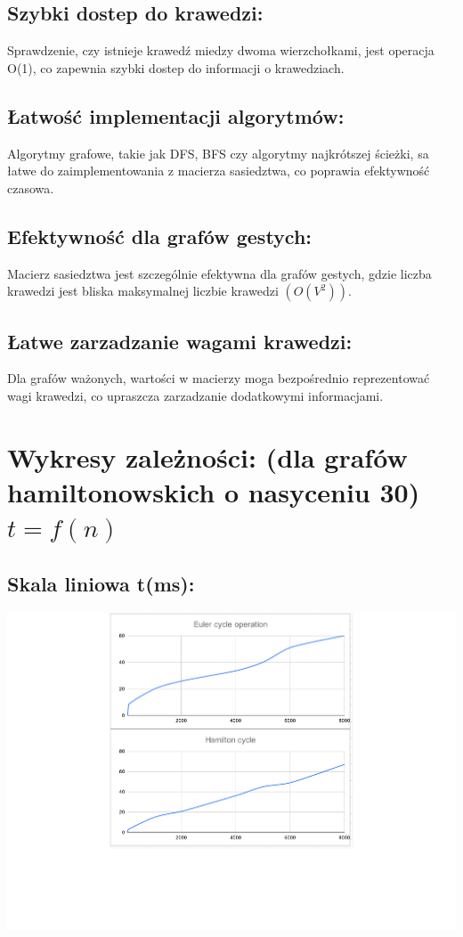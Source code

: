 \documentclass[12pt]{article}
\begin{document}
    \subsection{Szybki dostep do krawedzi:}
        Sprawdzenie, czy istnieje krawedź miedzy dwoma wierzchołkami, jest operacja O(1), co zapewnia szybki dostep do informacji o krawedziach.

    \subsection{Łatwość implementacji algorytmów:}
        Algorytmy grafowe, takie jak DFS, BFS czy algorytmy najkrótszej ścieżki, sa łatwe do zaimplementowania z macierza sasiedztwa, co poprawia efektywność czasowa.

    \subsection{Efektywność dla grafów gestych:}
        Macierz sasiedztwa jest szczególnie efektywna dla grafów gestych, gdzie liczba krawedzi jest bliska maksymalnej liczbie krawedzi $(O(V^2))$.

    \subsection{Łatwe zarzadzanie wagami krawedzi:}
        Dla grafów ważonych, wartości w macierzy moga bezpośrednio reprezentować wagi krawedzi, co upraszcza zarzadzanie dodatkowymi informacjami.


\section{Wykresy zależności: (dla grafów hamiltonowskich o nasyceniu 30) $ t = f(n) $}

\subsection{Skala liniowa t(ms): }

\begin{center}

\includegraphics[width=\linewidth]{wykres_liniowy_0.pdf}

\end{center}
\end{document}
